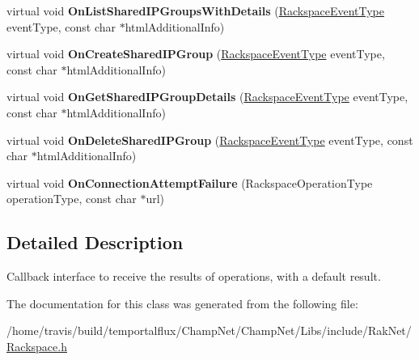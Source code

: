 \begin{DoxyCompactItemize}
\item 
\hypertarget{class_rak_net_1_1_rackspace_event_callback___default_a41cc50281a28679606c7d6be203a3997}{virtual void {\bfseries On\-List\-Shared\-I\-P\-Groups\-With\-Details} (\hyperlink{namespace_rak_net_a120cf6e1a0904cff45269f14c3c4c289}{Rackspace\-Event\-Type} event\-Type, const char $\ast$html\-Additional\-Info)}\label{class_rak_net_1_1_rackspace_event_callback___default_a41cc50281a28679606c7d6be203a3997}

\item 
\hypertarget{class_rak_net_1_1_rackspace_event_callback___default_ad53c6a93d713daedf27e5896cd406857}{virtual void {\bfseries On\-Create\-Shared\-I\-P\-Group} (\hyperlink{namespace_rak_net_a120cf6e1a0904cff45269f14c3c4c289}{Rackspace\-Event\-Type} event\-Type, const char $\ast$html\-Additional\-Info)}\label{class_rak_net_1_1_rackspace_event_callback___default_ad53c6a93d713daedf27e5896cd406857}

\item 
\hypertarget{class_rak_net_1_1_rackspace_event_callback___default_a1cd7341bc293409a29150729345ef360}{virtual void {\bfseries On\-Get\-Shared\-I\-P\-Group\-Details} (\hyperlink{namespace_rak_net_a120cf6e1a0904cff45269f14c3c4c289}{Rackspace\-Event\-Type} event\-Type, const char $\ast$html\-Additional\-Info)}\label{class_rak_net_1_1_rackspace_event_callback___default_a1cd7341bc293409a29150729345ef360}

\item 
\hypertarget{class_rak_net_1_1_rackspace_event_callback___default_aba7c3c6c9afb146bc21c4717cd26364b}{virtual void {\bfseries On\-Delete\-Shared\-I\-P\-Group} (\hyperlink{namespace_rak_net_a120cf6e1a0904cff45269f14c3c4c289}{Rackspace\-Event\-Type} event\-Type, const char $\ast$html\-Additional\-Info)}\label{class_rak_net_1_1_rackspace_event_callback___default_aba7c3c6c9afb146bc21c4717cd26364b}

\item 
\hypertarget{class_rak_net_1_1_rackspace_event_callback___default_adcd9b0f6e45303fd996e2be16279397e}{virtual void {\bfseries On\-Connection\-Attempt\-Failure} (Rackspace\-Operation\-Type operation\-Type, const char $\ast$url)}\label{class_rak_net_1_1_rackspace_event_callback___default_adcd9b0f6e45303fd996e2be16279397e}

\end{DoxyCompactItemize}


\subsection{Detailed Description}
Callback interface to receive the results of operations, with a default result. 

The documentation for this class was generated from the following file\-:\begin{DoxyCompactItemize}
\item 
/home/travis/build/temportalflux/\-Champ\-Net/\-Champ\-Net/\-Libs/include/\-Rak\-Net/\hyperlink{_rackspace_8h}{Rackspace.\-h}\end{DoxyCompactItemize}
